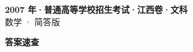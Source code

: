 \documentclass[zihao=-4, a4paper]{ctexart}
\begin{document}
\begin{center}
  {\Large\bfseries 2007 年·普通高等学校招生考试·江西卷·文科}\\[4pt]
  {\large 数学 · 简答版}
\end{center}
\medskip
{}

\clearpage
{}
\begin{center}{\Large\bfseries 答案速查}\end{center}
\medskip

\end{document}

